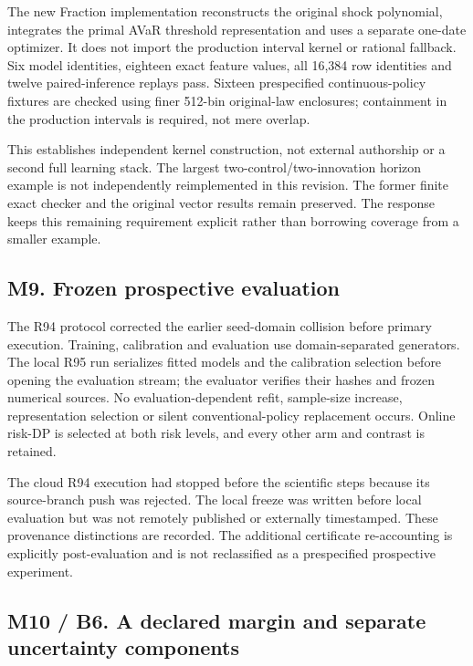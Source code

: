 The new Fraction implementation reconstructs the original shock
polynomial, integrates the primal AVaR threshold representation and uses
a separate one-date optimizer. It does not import the production
interval kernel or rational fallback. Six model identities, eighteen
exact feature values, all 16,384 row identities and twelve
paired-inference replays pass. Sixteen prespecified continuous-policy
fixtures are checked using finer 512-bin original-law enclosures;
containment in the production intervals is required, not mere overlap.

This establishes independent kernel construction, not external
authorship or a second full learning stack. The largest
two-control/two-innovation horizon example is not independently
reimplemented in this revision. The former finite exact checker and the
original vector results remain preserved. The response keeps this
remaining requirement explicit rather than borrowing coverage from a
smaller example.

\hypertarget{m9.-frozen-prospective-evaluation}{%
\subsection{M9. Frozen prospective
evaluation}\label{m9.-frozen-prospective-evaluation}}

The R94 protocol corrected the earlier seed-domain collision before
primary execution. Training, calibration and evaluation use
domain-separated generators. The local R95 run serializes fitted models
and the calibration selection before opening the evaluation stream; the
evaluator verifies their hashes and frozen numerical sources. No
evaluation-dependent refit, sample-size increase, representation
selection or silent conventional-policy replacement occurs. Online
risk-DP is selected at both risk levels, and every other arm and
contrast is retained.

The cloud R94 execution had stopped before the scientific steps because
its source-branch push was rejected. The local freeze was written before
local evaluation but was not remotely published or externally
timestamped. These provenance distinctions are recorded. The additional
certificate re-accounting is explicitly post-evaluation and is not
reclassified as a prespecified prospective experiment.

\hypertarget{m10-b6.-a-declared-margin-and-separate-uncertainty-components}{%
\subsection{M10 / B6. A declared margin and separate uncertainty
components}\label{m10-b6.-a-declared-margin-and-separate-uncertainty-components}}

